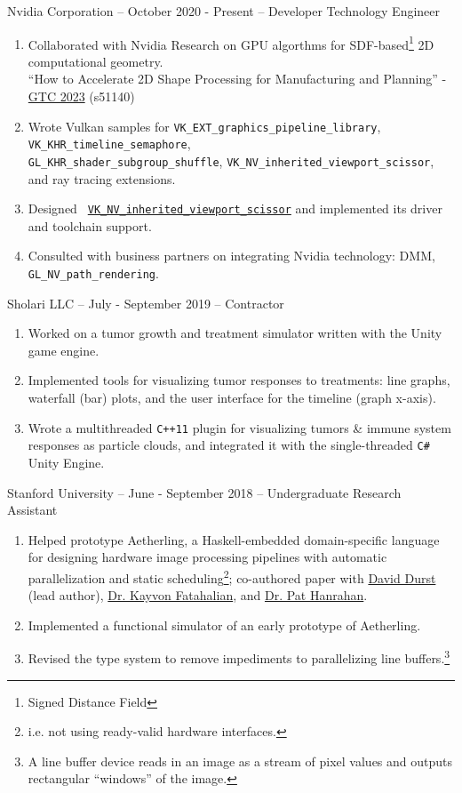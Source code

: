 \documentclass[11pt]{article}
\newcommand{\webText}[2]{{\color{webColor} \href{#1}{#2}}}
\newcommand{\mySub}[1]{{\color{subColor}\hspace{-6mm} \textsf{#1}}}
\newcommand{\lighttt}[1]{{\color{lightttColor}\texttt{#1}}}
\begin{document}
\mySub{Nvidia Corporation -- October 2020 - Present -- Developer Technology Engineer}
\begin{enumerate}
\item Collaborated with Nvidia Research on GPU algorthms for
  SDF-based\footnote{Signed Distance Field} 2D computational
  geometry.\\ ``How to Accelerate 2D Shape Processing for
  Manufacturing and Planning'' -
  \webText{https://www.nvidia.com/en-us/on-demand/session/gtcspring23-s51140/}{GTC
    2023} (s51140)

\item Wrote Vulkan samples for
  \lighttt{VK\_EXT\_graphics\_pipeline\_library},
  \lighttt{VK\_KHR\_timeline\_semaphore},\\
  \lighttt{GL\_KHR\_shader\_subgroup\_shuffle},
  \lighttt{VK\_NV\_inherited\_viewport\_scissor}, and ray tracing extensions.

\item
  Designed
  \texttt{\webText{https://registry.khronos.org/vulkan/specs/1.3-extensions/man/html/VK_NV_inherited_viewport_scissor.html}{VK\_NV\_inherited\_viewport\_scissor}}
  and implemented its driver and toolchain support.

\item Consulted with business partners on integrating Nvidia
  technology: DMM, \lighttt{GL\_NV\_path\_rendering}.
\end{enumerate}
\filbreak
\mySub{Sholari LLC -- July - September 2019 -- Contractor}
\begin{enumerate}
\item Worked on a tumor growth and treatment simulator written with
  the Unity game engine.
\item Implemented tools for visualizing tumor responses to treatments:
  line graphs, waterfall (bar) plots, and the user interface for the
  timeline (graph x-axis).
\item Wrote a multithreaded \lighttt{C++11} plugin for visualizing
  tumors \& immune system responses as particle clouds, and integrated
  it with the single-threaded \lighttt{C\#} Unity Engine.
\end{enumerate}
\filbreak
\mySub{Stanford University -- June - September 2018 --
  Undergraduate Research Assistant}
\begin{enumerate}
\item Helped prototype Aetherling, a Haskell-embedded domain-specific
  language for designing hardware image processing pipelines with
  automatic parallelization and static scheduling\footnote{i.e. not
  using ready-valid hardware interfaces.};
  co-authored paper with
  \webText{https://david-durst.github.io/}{David Durst} (lead author),
  \webText{https://graphics.stanford.edu/~kayvonf/}{Dr. Kayvon Fatahalian},
  and \webText{https://graphics.stanford.edu/~hanrahan/}{Dr. Pat Hanrahan}.
\item Implemented a functional simulator of an early prototype of
  Aetherling.
\item Revised the type system to remove impediments to parallelizing
  line buffers.\footnote{A line buffer device reads in an image as a
  stream of pixel values and outputs rectangular ``windows'' of the
  image.}
\end{enumerate}
\end{document}
